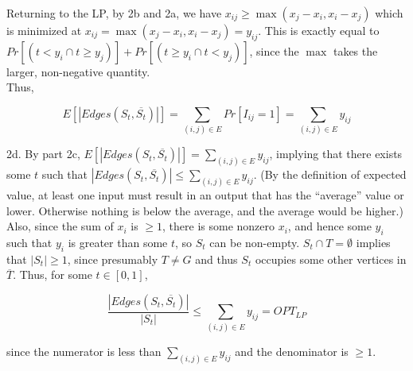 Returning to the LP, by 2b and 2a, we have $x_{ij} \geq \max(x_j - x_i, x_i - x_j)$ which is minimized at $x_{ij} = \max(x_j - x_i, x_i - x_j) = y_{ij}$. This is exactly equal to \\$Pr[ (t < y_i \cap t \geq y_j)] + Pr [(t \geq y_i \cap t < y_j)] $, since the $\max$ takes the larger, non-negative quantity.\\

Thus, 

$$E[|Edges(S_t, \overline{S_t})|] = \sum_{(i, j) \in E} Pr[I_{ij} = 1] = \sum_{(i, j) \in E} y_{ij}$$

2d. By part 2c, $E[|Edges(S_t, \overline{S_t})|] = \sum_{(i, j) \in E} y_{ij}$, implying that there exists some $t$ such that $|Edges(S_t, \overline{S_t})| \leq \sum_{(i, j) \in E} y_{ij}$. (By the definition of expected value, at least one input must result in an output that has the ``average'' value or lower. Otherwise nothing is below the average, and the average would be higher.) \\

Also, since the sum of $x_i$ is $\geq 1$, there is some nonzero $x_i$, and hence some $y_i$ such that $y_i$ is greater than some $t$, so $S_t$ can be non-empty. $S_t \cap T = \emptyset$ implies that $|S_t| \geq 1$, since presumably $T \neq G$ and thus $S_t$ occupies some other vertices in $\overline{T}$. Thus, for some $t \in [0, 1]$,

$$\frac{|Edges(S_t, \overline{S_t})|}{|S_t|} \leq \sum_{(i, j) \in E} y_{ij} = OPT_{LP}$$

since the numerator is less than $\sum_{(i, j) \in E} y_{ij}$ and the denominator is $\geq 1$.





